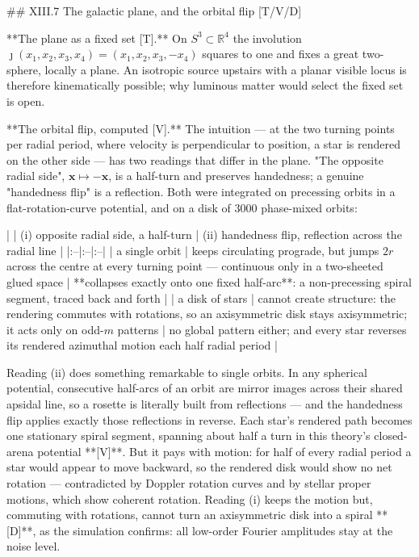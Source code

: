 ## XIII.7 The galactic plane, and the orbital flip [T/V/D]

**The plane as a fixed set [T].** On $S^3\subset\mathbb{R}^4$ the involution $\jmath(x_1,x_2,x_3,x_4) = (x_1,x_2,x_3,-x_4)$ squares to one and fixes a great two-sphere, locally a plane. An isotropic source upstairs with a planar visible locus is therefore kinematically possible; why luminous matter would select the fixed set is open.

**The orbital flip, computed [V].** The intuition — at the two turning points per radial period, where velocity is perpendicular to position, a star is rendered on the other side — has two readings that differ in the plane. "The opposite radial side", $\mathbf x\mapsto-\mathbf x$, is a half-turn and preserves handedness; a genuine "handedness flip" is a reflection. Both were integrated on precessing orbits in a flat-rotation-curve potential, and on a disk of 3000 phase-mixed orbits:

| | (i) opposite radial side, a half-turn | (ii) handedness flip, reflection across the radial line |
|:--|:--|:--|
| a single orbit | keeps circulating prograde, but jumps $2r$ across the centre at every turning point — continuous only in a two-sheeted glued space | **collapses exactly onto one fixed half-arc**: a non-precessing spiral segment, traced back and forth |
| a disk of stars | cannot create structure: the rendering commutes with rotations, so an axisymmetric disk stays axisymmetric; it acts only on odd-$m$ patterns | no global pattern either; and every star reverses its rendered azimuthal motion each half radial period |

Reading (ii) does something remarkable to single orbits. In any spherical potential, consecutive half-arcs of an orbit are mirror images across their shared apsidal line, so a rosette is literally built from reflections — and the handedness flip applies exactly those reflections in reverse. Each star's rendered path becomes one stationary spiral segment, spanning about half a turn in this theory's closed-arena potential **[V]**. But it pays with motion: for half of every radial period a star would appear to move backward, so the rendered disk would show no net rotation — contradicted by Doppler rotation curves and by stellar proper motions, which show coherent rotation. Reading (i) keeps the motion but, commuting with rotations, cannot turn an axisymmetric disk into a spiral **[D]**, as the simulation confirms: all low-order Fourier amplitudes stay at the noise level.

